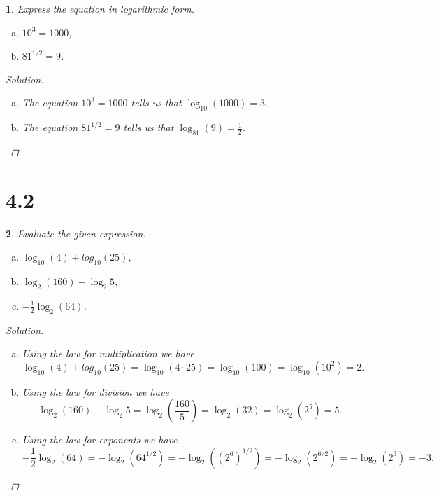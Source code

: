 \documentclass[12pt]{amsart}
\newtheorem{thm}{}
\begin{document}
\setcounter{thm}{33} 
\begin{thm}
  Express the equation in logarithmic form.
  \begin{enumerate}[(a)]
  \item
    $10^3 = 1000$,
  \item
    $81^{1/2} = 9$.
  \end{enumerate}

  \begin{proof}[Solution]
    \begin{enumerate}[(a)]
    \item
      The equation $10^3 = 1000$ tells us that $\log_{10}(1000) = 3$.
    \item
      The equation $81^{1/2} = 9$ tells us that $\log_{81}(9) = \frac{1}{2}$.
    \end{enumerate}    
  \end{proof}
\end{thm}

\section*{4.2}

\setcounter{thm}{9} 
\begin{thm}
  Evaluate the given expression.
  \begin{enumerate}[(a)]
  \item
    $\log_{10}(4) + log_{10}(25)$,
  \item
    $\log_2(160) - \log_2{5}$,
  \item
    $-\frac{1}{2}\log_2(64)$.
  \end{enumerate}
  \begin{proof}[Solution]
    \begin{enumerate}[(a)]
    \item
      Using the law for multiplication we have
      $$\log_{10}(4) + log_{10}(25) = \log_{10}(4 \cdot 25) = \log_{10}(100) = \log_{10}(10^2) = 2.$$
    \item
      Using the law for division we have
      $$\log_2(160) - \log_2{5} = \log_2\left(\frac{160}{5}\right) = \log_2(32) = \log_2(2^5) = 5.$$
    \item
      Using the law for exponents we have
      $$-\frac{1}{2}\log_2(64) = -\log_2(64^{1/2}) = -\log_2((2^6)^{1/2}) = -\log_2(2^{6/2}) = -\log_2(2^3) = -3.$$
    \end{enumerate}    
  \end{proof}
\end{thm}
\end{document}
